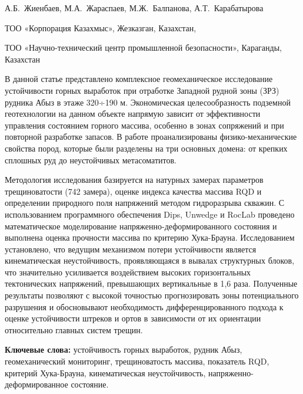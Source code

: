 
\begin{header}

А.Б.~Жиенбаев,
М.А.~Жараспаев,
М.Ж.~Балпанова,
А.Т.~Карабатырова\envelope
\end{header}

\begin{affil}
ТОО «Корпорация Казахмыс», Жезказган, Казахстан,

ТОО «Научно-технический центр промышленной безопасности», Караганды, Казахстан

\end{affil}

В данной статье представлено комплексное геомеханическое исследование
устойчивости горных выработок при отработке Западной рудной зоны (ЗРЗ)
рудника Абыз в этаже 320÷190 м. Экономическая целесообразность подземной
геотехнологии на данном объекте напрямую зависит от эффективности
управления состоянием горного массива, особенно в зонах сопряжений и при
повторной разработке запасов. В работе проанализированы
физико-механические свойства пород, которые были разделены на три
основных домена: от крепких сплошных руд до неустойчивых метасоматитов.

Методология исследования базируется на натурных замерах параметров
трещиноватости (742 замера), оценке индекса качества массива RQD и
определении природного поля напряжений методом гидроразрыва скважин. С
использованием программного обеспечения Dips, Unwedge и RocLab проведено
математическое моделирование напряженно-деформированного состояния и
выполнена оценка прочности массива по критерию Хука-Брауна.
Исследованием установлено, что ведущим механизмом потери устойчивости
является кинематическая неустойчивость, проявляющаяся в вывалах
структурных блоков, что значительно усиливается воздействием высоких
горизонтальных тектонических напряжений, превышающих вертикальные в 1,6
раза. Полученные результаты позволяют с высокой точностью прогнозировать
зоны потенциального разрушения и обосновывают необходимость
дифференцированного подхода к оценке устойчивости штреков и ортов в
зависимости от их ориентации относительно главных систем трещин.

{\bfseries Ключевые слова:} устойчивость горных выработок, рудник Абыз,
геомеханический мониторинг, трещиноватость массива, показатель RQD,
критерий Хука-Брауна, кинематическая неустойчивость,
напряженно-деформированное состояние.

